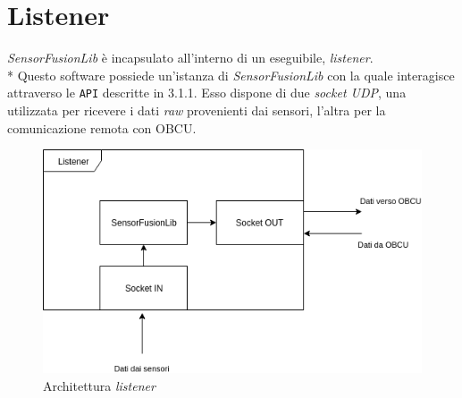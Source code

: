 \section{Listener}
\textit{SensorFusionLib} \`e incapsulato all'interno di un eseguibile, \textit{listener}.\\*
Questo software possiede un'istanza di \textit{SensorFusionLib} con la quale interagisce attraverso le \texttt{API} descritte in 3.1.1. Esso dispone di due \textit{socket UDP}, una utilizzata per ricevere i dati \textit{raw} provenienti dai sensori, l'altra per la comunicazione remota con OBCU.
\begin{figure}[h]
	\centering
	\includegraphics[width=0.7\linewidth]{img/ListenerOK}
	\caption{Architettura \emph{listener}}
	\label{fig:listener}
\end{figure}
